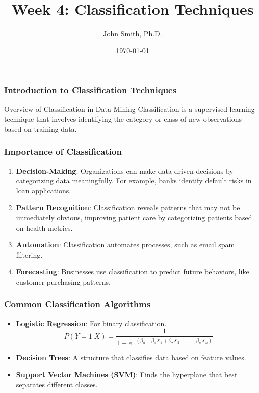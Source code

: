 \documentclass[aspectratio=169]{beamer}
\title[Classification Techniques]{Week 4: Classification Techniques}
\author[J. Smith]{John Smith, Ph.D.}
\institute[University Name]{
  Department of Computer Science\\
  University Name\\
  \vspace{0.3cm}
  Email: email@university.edu\\
  Website: www.university.edu
}
\date{\today}
\begin{document}
\frame{\titlepage}

\begin{frame}[fragile]
    \frametitle{Introduction to Classification Techniques}
    \begin{block}{Overview of Classification in Data Mining}
        Classification is a supervised learning technique that involves identifying the category or class of new observations based on training data.
    \end{block}
\end{frame}

\begin{frame}[fragile]
    \frametitle{Importance of Classification}
    \begin{enumerate}
        \item \textbf{Decision-Making}: Organizations can make data-driven decisions by categorizing data meaningfully. For example, banks identify default risks in loan applications.
        
        \item \textbf{Pattern Recognition}: Classification reveals patterns that may not be immediately obvious, improving patient care by categorizing patients based on health metrics.
        
        \item \textbf{Automation}: Classification automates processes, such as email spam filtering.
        
        \item \textbf{Forecasting}: Businesses use classification to predict future behaviors, like customer purchasing patterns.
    \end{enumerate}
\end{frame}

\begin{frame}[fragile]
    \frametitle{Common Classification Algorithms}
    \begin{itemize}
        \item \textbf{Logistic Regression}: For binary classification. 
        \begin{equation}
            P(Y=1|X) = \frac{1}{1 + e^{-(\beta_0 + \beta_1X_1 + \beta_2X_2 + ... + \beta_nX_n)}}
        \end{equation}
        
        \item \textbf{Decision Trees}: A structure that classifies data based on feature values.
        
        \item \textbf{Support Vector Machines (SVM)}: Finds the hyperplane that best separates different classes.
    \end{itemize}
\end{frame}
\end{document}
